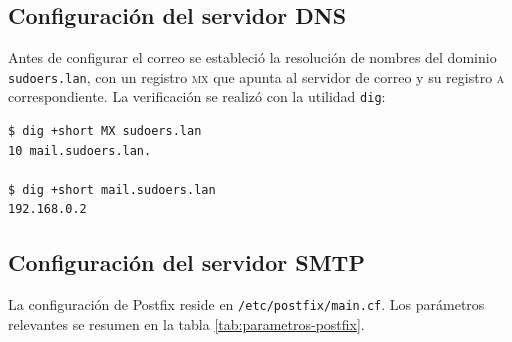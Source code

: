 \subsection{Configuraci\'on del servidor DNS}

Antes de configurar el correo se estableci\'o la resoluci\'on de nombres del
dominio \texttt{sudoers.lan}, con un registro \textsc{mx} que apunta al
servidor de correo y su registro \textsc{a} correspondiente. La
verificaci\'on se realiz\'o con la utilidad \texttt{dig}:

\begin{lstlisting}[style=terminal]
$ dig +short MX sudoers.lan
10 mail.sudoers.lan.

$ dig +short mail.sudoers.lan
192.168.0.2
\end{lstlisting}


\subsection{Configuraci\'on del servidor SMTP}

La configuraci\'on de Postfix reside en \texttt{/etc/postfix/main.cf}. Los
par\'ametros relevantes se resumen en la tabla \ref{tab:parametros-postfix}.

